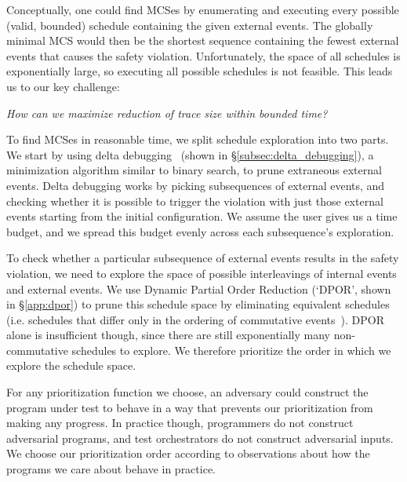 
Conceptually, one could find MCSes by enumerating and executing every possible
(valid, bounded) schedule containing the given external events. The globally minimal MCS would
then be the shortest sequence containing
the fewest external events that causes the safety violation. Unfortunately, the space of all
schedules is exponentially large, so executing all possible schedules is not feasible.
This leads us to our key challenge:

\begin{displayquote}
{\em How can we maximize reduction of trace size within bounded time?}
\end{displayquote}


To find MCSes in reasonable time, we split schedule exploration into two
parts. We start by using delta debugging~\cite{Zeller:2002:SIF:506201.506206}
(shown in \S\ref{subsec:delta_debugging}), a minimization
algorithm similar to binary search, to prune extraneous external events. Delta debugging works by picking subsequences of external events, and checking whether
it is possible to trigger the violation with just those external
events starting from the initial configuration. We assume the user gives us a time budget, and we spread this budget evenly across each subsequence's exploration.

To check whether a particular subsequence of external events results in the safety violation,
we need to explore the space of possible interleavings of internal events and external events.
We use Dynamic Partial Order Reduction (`DPOR', shown in \S\ref{app:dpor}) to prune this schedule space by eliminating equivalent schedules (i.e. schedules
that differ only in the ordering of commutative
events~\cite{flanagan2005dynamic}). DPOR alone is insufficient though, since
there are still exponentially many non-commutative schedules to explore.
We therefore prioritize the order in which we explore the schedule space.

For any prioritization function we choose, an adversary could construct
the program under test to behave in a way that prevents our prioritization
from making any progress. In practice though,
programmers do not construct adversarial programs, and test orchestrators do not construct adversarial inputs. We choose our
prioritization order according to observations about how the programs we
care about behave in practice.

